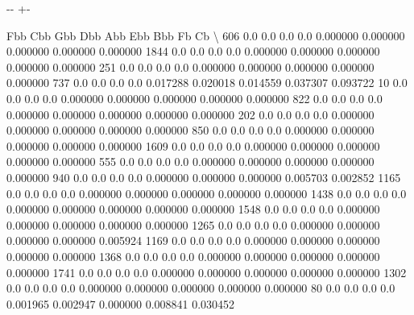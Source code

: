 \documentclass[letterpaper,10pt,english]{sphinxmanual}
\newlength\nbsphinxcodecellspacing
\begin{document}
{

\kern-\sphinxverbatimsmallskipamount\kern-\baselineskip
\kern+\FrameHeightAdjust\kern-\fboxrule
\vspace{\nbsphinxcodecellspacing}

\begin{sphinxVerbatim}[commandchars=\\\{\}]
\llap{\color{nbsphinxout}[12]:\,\hspace{\fboxrule}\hspace{\fboxsep}}      Fbb  Cbb  Gbb  Dbb       Abb       Ebb       Bbb        Fb        Cb  \textbackslash{}
606   0.0  0.0  0.0  0.0  0.000000  0.000000  0.000000  0.000000  0.000000
1844  0.0  0.0  0.0  0.0  0.000000  0.000000  0.000000  0.000000  0.000000
251   0.0  0.0  0.0  0.0  0.000000  0.000000  0.000000  0.000000  0.000000
737   0.0  0.0  0.0  0.0  0.017288  0.020018  0.014559  0.037307  0.093722
10    0.0  0.0  0.0  0.0  0.000000  0.000000  0.000000  0.000000  0.000000
822   0.0  0.0  0.0  0.0  0.000000  0.000000  0.000000  0.000000  0.000000
202   0.0  0.0  0.0  0.0  0.000000  0.000000  0.000000  0.000000  0.000000
850   0.0  0.0  0.0  0.0  0.000000  0.000000  0.000000  0.000000  0.000000
1609  0.0  0.0  0.0  0.0  0.000000  0.000000  0.000000  0.000000  0.000000
555   0.0  0.0  0.0  0.0  0.000000  0.000000  0.000000  0.000000  0.000000
940   0.0  0.0  0.0  0.0  0.000000  0.000000  0.000000  0.005703  0.002852
1165  0.0  0.0  0.0  0.0  0.000000  0.000000  0.000000  0.000000  0.000000
1438  0.0  0.0  0.0  0.0  0.000000  0.000000  0.000000  0.000000  0.000000
1548  0.0  0.0  0.0  0.0  0.000000  0.000000  0.000000  0.000000  0.000000
1265  0.0  0.0  0.0  0.0  0.000000  0.000000  0.000000  0.000000  0.005924
1169  0.0  0.0  0.0  0.0  0.000000  0.000000  0.000000  0.000000  0.000000
1368  0.0  0.0  0.0  0.0  0.000000  0.000000  0.000000  0.000000  0.000000
1741  0.0  0.0  0.0  0.0  0.000000  0.000000  0.000000  0.000000  0.000000
1302  0.0  0.0  0.0  0.0  0.000000  0.000000  0.000000  0.000000  0.000000
80    0.0  0.0  0.0  0.0  0.001965  0.002947  0.000000  0.008841  0.030452


\end{sphinxVerbatim}}
\end{document}
